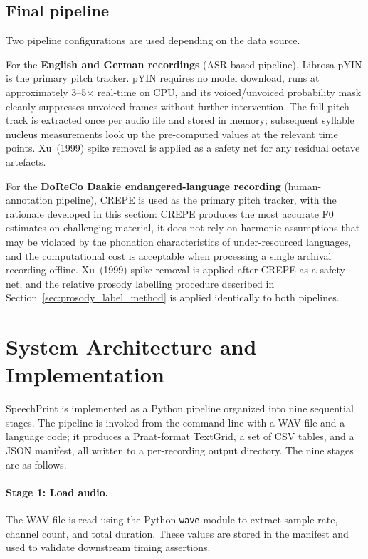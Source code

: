 \subsection{Final pipeline}

Two pipeline configurations are used depending on the data source.

For the \textbf{English and German recordings} (ASR-based pipeline), Librosa
pYIN is the primary pitch tracker. pYIN requires no model download, runs at
approximately 3--5$\times$ real-time on CPU, and its voiced/unvoiced probability
mask cleanly suppresses unvoiced frames without further intervention. The full
pitch track is extracted once per audio file and stored in memory; subsequent
syllable nucleus measurements look up the pre-computed values at the relevant
time points. Xu~(1999) spike removal is applied as a safety net for any residual
octave artefacts.

For the \textbf{DoReCo Daakie endangered-language recording} (human-annotation
pipeline), CREPE is used as the primary pitch tracker, with the rationale
developed in this section: CREPE produces the most accurate F0 estimates on
challenging material, it does not rely on harmonic assumptions that may be
violated by the phonation characteristics of under-resourced languages, and the
computational cost is acceptable when processing a single archival recording
offline. Xu~(1999) spike removal is applied after CREPE as a safety net, and the
relative prosody labelling procedure described in
Section~\ref{sec:prosody_label_method} is applied identically to both
pipelines.


\section{System Architecture and Implementation}
\label{sec:implementation}

SpeechPrint is implemented as a Python pipeline organized into nine sequential
stages. The pipeline is invoked from the command line with a WAV file and a
language code; it produces a Praat-format TextGrid, a set of CSV tables, and a
JSON manifest, all written to a per-recording output directory. The nine stages
are as follows.

\paragraph{Stage 1: Load audio.}
The WAV file is read using the Python \texttt{wave} module to extract sample
rate, channel count, and total duration. These values are stored in the manifest
and used to validate downstream timing assertions.

